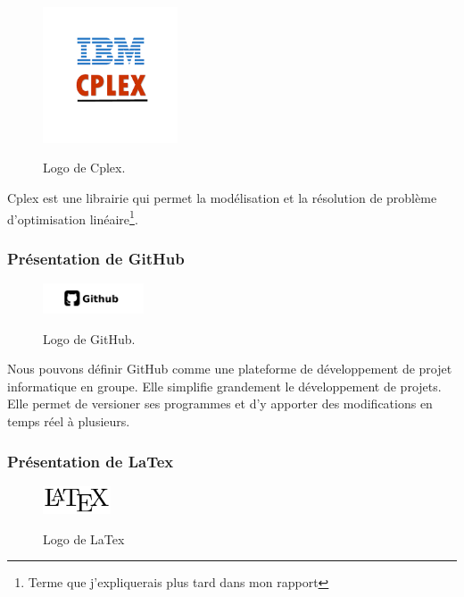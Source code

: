 \begin{figure}[h]
  \begin{center}
  \includegraphics[width=4cm]{./images/cplex.png}\label{Cplex}
  \caption{Logo de Cplex.}
  \end{center}
\end{figure}

Cplex est une librairie qui permet la modélisation et la résolution de problème d'optimisation linéaire\footnote{Terme que j'expliquerais plus tard dans mon rapport}.
\newline
\newline
\subsubsection{Présentation de GitHub}
\begin{figure}[h]
  \begin{center}
  \includegraphics[width=3cm]{./images/github.jpg}\label{GitHub}
  \caption{Logo de GitHub.}
  \end{center}
\end{figure}


Nous pouvons définir GitHub comme une plateforme de développement de projet informatique en groupe. Elle simplifie grandement le développement de projets. Elle permet de versioner ses programmes et d'y apporter des modifications en temps réel à plusieurs.

\subsubsection{Présentation de LaTex}

\begin{figure}[h]
  \begin{center}
\includegraphics[width=2cm]{./images/Latex.png}\label{LaTex}
\caption{Logo de LaTex}
\end{center}
\end{figure}

